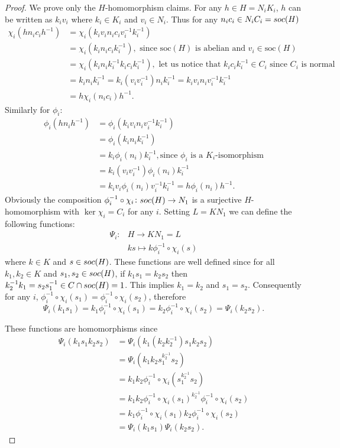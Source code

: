 \begin{proof}
    We prove only the $H$-homomorphism claims.
    For any $h \in H = N_iK_i$, $h$ can be written as $k_iv_i$ where $k_i \in K_i$ and $v_i \in N_i$. Thus for any $n_ic_i \in N_iC_i = soc {(H)}$
    \begin{align*}
        \chi_i(hn_ic_ih^{-1}) &= \chi_i(k_iv_in_ic_iv_i^{-1}k_i^{-1}) \\
        &= \chi_i(k_in_ic_ik_i^{-1}), \text{ since $\mathrm{soc}(H)$ is abelian and $v_i \in \mathrm{soc}(H)$} \\
        &= \chi_i(k_in_ik_i^{-1}k_ic_ik_i^{-1}), \text{ let us notice that $k_ic_ik_i^{-1} \in C_i$ since $C_i$ is normal} \\
        &= k_in_ik_i^{-1} = k_i(v_iv_i^{-1})n_ik_i^{-1} = k_iv_in_iv_i^{-1}k_i^{-1}\\
        &= h\chi_i(n_ic_i)h^{-1}.
    \end{align*}
    Similarly for $\phi_i$:
    \begin{align*}
        \phi_i(hn_ih^{-1}) &= \phi_i(k_iv_in_iv_i^{-1}k_i^{-1})\\
        &= \phi_i(k_in_ik_i^{-1}) \\
        &= k_i\phi_i(n_i)k_i^{-1}, \text{since $\phi_i$ is a $K_i$-isomorphism} \\
        &= k_i(v_iv_i^{-1})\phi_i(n_i)k_i^{-1} \\
        &= k_iv_i\phi_i(n_i)v_i^{-1}k_i^{-1}= h\phi_i(n_i)h^{-1}.
    \end{align*}
    Obviously the composition $\phi_i^{-1} \circ \chi_i \colon soc {(H)} \rightarrow N_1$ is a surjective $H$-homomorphism with $\ker \chi_i = C_i$ for any $i$. Setting $L=KN_1$ we can define the following functions:
    \begin{align*}
        \Psi_i \colon &H \longrightarrow KN_1 = L \\
                      &ks \mapsto k\phi_i^{-1} \circ \chi_i(s)
    \end{align*}
    where $k \in K$ and $s \in soc {(H)}$.
    These functions are well defined since for all $k_1, k_2 \in K$ and $s_1, s_2 \in soc {(H)}$, if $k_1s_1 = k_2s_2$ then $k_2^{-1}k_1 = s_2s_1^{-1} \in C \cap soc {(H)} = 1$. 
    This implies $k_1 = k_2$ and $s_1 = s_2$. 
    Consequently for any $i$, $\phi_i^{-1} \circ \chi_i(s_1) = \phi_i^{-1}\circ \chi_i(s_2)$, therefore 
    $$
    \Psi_i(k_1s_1) = k_1\phi_i^{-1} \circ \chi_i(s_1) = k_2\phi_i^{-1} \circ \chi_i(s_2) = \Psi_i(k_2s_2).
    $$

    These functions are homomorphisms since
    \begin{align*}
    \Psi_i(k_1s_1k_2s_2) & = \Psi_i(k_1(k_2k_2^{-1})s_1k_2s_2) \\
    & = \Psi_i(k_1k_2s_1^{k_2^{-1}}s_2) \\
    & = k_1k_2\phi_i^{-1} \circ \chi_i(s_1^{k_2^{-1}}s_2) \\
    & = k_1k_2\phi_i^{-1} \circ \chi_i(s_1)^{k_2^{-1}}\phi_i^{-1} \circ \chi_i(s_2) \\
    & = k_1\phi_i^{-1} \circ \chi_i(s_1)k_2\phi_i^{-1} \circ \chi_i(s_2) \\
    & = \Psi_i(k_1s_1)\Psi_i(k_2s_2).
    \end{align*}


\end{proof}
